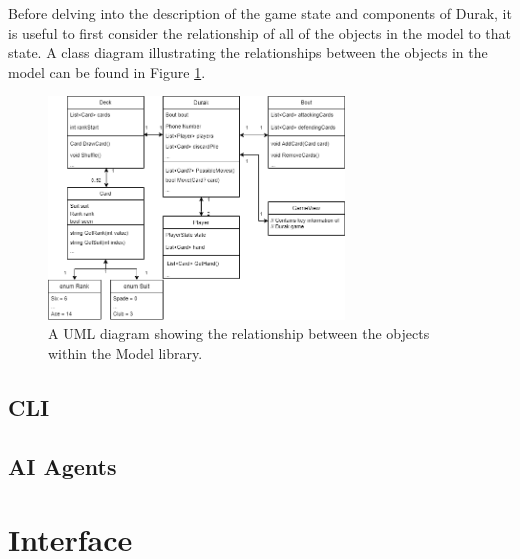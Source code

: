 Before delving into the description of the game state and components of Durak, it is useful to first consider the relationship of all of the objects in the model to that state. A class diagram illustrating the relationships between the objects in the model can be found in Figure \ref{fig:modelUML}.


\begin{figure}[h]
    \centering
    \captionsetup{justification=centering}
    \includegraphics[width=0.70\textwidth]{../img/modelUML.png}
    \caption{A UML diagram showing the relationship between the objects within the Model library.}
    \label{fig:modelUML}
\end{figure}

\subsection{CLI}
\label{CLI}

\subsection{AI Agents}

\section{Interface}
